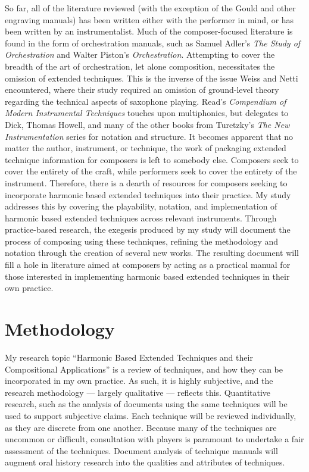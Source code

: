 So far, all of the literature reviewed (with the exception of the Gould and other engraving manuals) has been written either with the performer in mind, or has been written by an instrumentalist. 
Much of the composer-focused literature is found in the form of orchestration manuals, such as Samuel Adler’s \emph{The Study of Orchestration} and Walter Piston’s \emph{Orchestration}.\autocite{adlerStudyOrchestration2002, pistonOrchestration1969} 
Attempting to cover the breadth of the art of orchestration, let alone composition, necessitates the omission of extended techniques. 
This is the inverse of the issue Weiss and Netti encountered, where their study required an omission of ground-level theory regarding the technical aspects of saxophone playing. 
Read’s \emph{Compendium of Modern Instrumental Techniques} touches upon multiphonics, but delegates to Dick, Thomas Howell, and many of the other books from Turetzky’s \emph{The New Instrumentation} series for notation and structure.\autocite[160]{readCompendiumModernInstrumental1993} 
It becomes apparent that no matter the author, instrument, or technique, the work of packaging extended technique information for composers is left to somebody else. 
Composers seek to cover the entirety of the craft, while performers seek to cover the entirety of the instrument. 
Therefore, there is a dearth of resources for composers seeking to incorporate harmonic based extended techniques into their practice. 
My study addresses this by covering the playability, notation, and implementation of harmonic based extended techniques across relevant instruments. 
Through practice-based research, the exegesis produced by my study will document the process of composing using these techniques, refining the methodology and notation through the creation of several new works. 
The resulting document will fill a hole in literature aimed at composers by acting as a practical manual for those interested in implementing harmonic based extended techniques in their own practice.


\newpage

\section{Methodology}
My research topic “Harmonic Based Extended Techniques and their Compositional Applications” is a review of techniques, and how they can be incorporated in my own practice. 
As such, it is highly subjective, and the research methodology --- largely qualitative --- reflects this. 
Quantitative research, such as the analysis of documents using the same techniques will be used to support subjective claims. 
Each technique will be reviewed individually, as they are discrete from one another. 
Because many of the techniques are uncommon or difficult, consultation with players is paramount to undertake a fair assessment of the techniques. 
Document analysis of technique manuals will augment oral history research into the qualities and attributes of techniques.

